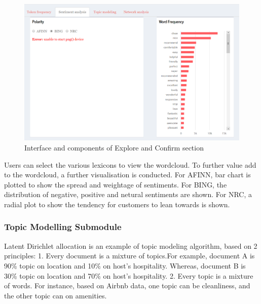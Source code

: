 \documentclass{acm_proc_article-sp}
\begin{document}
\begin{figure}[H]

{\centering \includegraphics[width=1\linewidth]{images/sentimentanalysis} 

}

\caption{Interface and components of Explore and Confirm section}\label{fig:unnamed-chunk-6}
\end{figure}

Users can select the various lexicons to view the wordcloud. To further
value add to the wordcloud, a further visualisation is conducted. For
AFINN, bar chart is plotted to show the spread and weightage of
sentiments. For BING, the distribution of negative, positive and netural
sentiments are shown. For NRC, a radial plot to show the tendency for
customers to lean towards is shown.

\hypertarget{topic-modelling-submodule}{%
\subsubsection{Topic Modelling
Submodule}\label{topic-modelling-submodule}}

Latent Dirichlet allocation is an example of topic modeling algorithm,
based on 2 principles: 1. Every document is a mixture of topics.For
example, document A is 90\% topic on location and 10\% on host's
hospitality. Whereas, document B is 30\% topic on location and 70\% on
host's hospitality. 2. Every topic is a mixture of words. For instance,
based on Airbnb data, one topic can be cleanliness, and the other topic
can on amenities.
\end{document}
